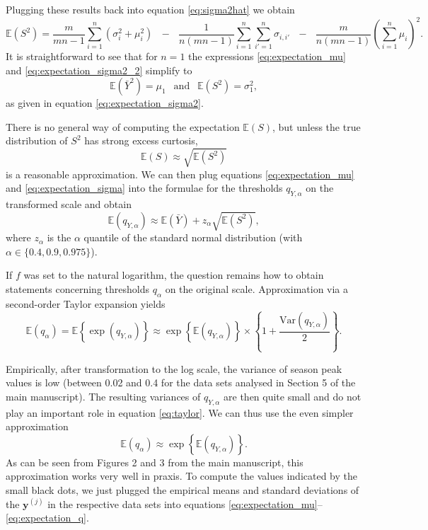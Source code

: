 \documentclass{article}
\newcommand{\mean}{\bar{Y}}
\begin{document}
Plugging these results back into equation \eqref{eq:sigma2hat} we obtain
\begin{equation}
\mathbb{E}(S^2) = \frac{m}{mn - 1} \sum_{i = 1}^n (\sigma_{i}^2 + \mu_i^2) \ \ \ - \ \ \ \frac{1}{n(mn - 1)} \sum_{i = 1}^n \sum_{i' = 1}^n \sigma_{i,i'} \ \ \ - \ \ \ \frac{m}{n(mn - 1)}\left(\sum_{i = 1}^n \mu_i\right)^2.
\label{eq:expectation_sigma2_2}
\end{equation}
It is straightforward to see that for $n = 1$ the expressions \eqref{eq:expectation_mu} and \eqref{eq:expectation_sigma2_2} simplify to
$$
\mathbb{E}(\mean^2) = \mu_1 \ \ \text{ and } \ \ \mathbb{E}(S^2) = \sigma^2_1,
$$
as given in equation \eqref{eq:expectation_sigma2}.

There is no general way of computing the expectation $\mathbb{E}(S)$, but unless the true distribution of  $S^2$ has strong excess curtosis,
\begin{equation}
\mathbb{E}(S) \approx \sqrt{\mathbb{E}(S^2)}
\label{eq:expectation_sigma}
\end{equation}
is a reasonable approximation. We can then plug equations \eqref{eq:expectation_mu} and \eqref{eq:expectation_sigma} into the formulae for the thresholds $q_{Y, \alpha}$ on the transformed scale and obtain
$$
\mathbb{E}(q_{Y, \alpha}) \approx \mathbb{E}(\mean) + z_\alpha \sqrt{\mathbb{E}(S^2)},
$$
where $z_\alpha$ is the $\alpha$ quantile of the standard normal distribution (with $\alpha \in \{0.4, 0.9, 0.975\}$).

If $f$ was set to the natural logarithm, the question remains how to obtain statements concerning thresholds $q_\alpha$ on the original scale. Approximation via a second-order Taylor expansion yields
\begin{equation}
\mathbb{E}(q_\alpha) = \mathbb{E}\left\{\exp(q_{Y, \alpha})\right\} \approx \exp\left\{\mathbb{E}(q_{Y, \alpha})\right\} \times \left\{1 + \frac{\text{Var}(q_{Y, \alpha})}{2} \right\}.
\label{eq:taylor}
\end{equation}

Empirically, after transformation to the log scale, the variance of season peak values is low (between 0.02 and 0.4 for the data sets analysed in Section 5 of the main manuscript). The resulting variances of $q_{Y, \alpha}$ are then quite small and do not play an important role in equation \eqref{eq:taylor}. We can thus use the even simpler approximation
\begin{equation}
\mathbb{E}(q_\alpha) \approx \exp\left\{\mathbb{E}(q_{Y, \alpha})\right\}.
\end{equation}
As can be seen from Figures 2 and 3 from the main manuscript, this approximation works very well in praxis. To compute the values indicated by the small black dots, we just plugged the empirical means and standard deviations of the $\mathbf{y}^{(j)}$ in the respective data sets into equations \eqref{eq:expectation_mu}--\eqref{eq:expectation_q}.
\end{document}
